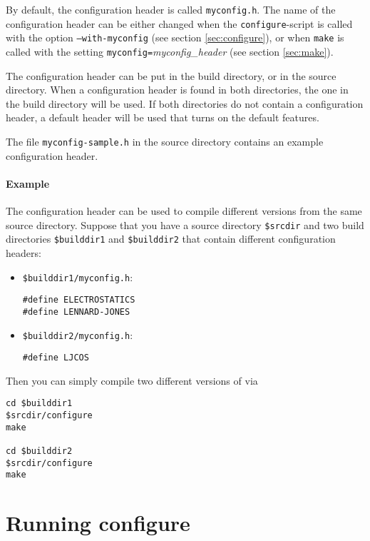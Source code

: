 By default, the configuration header is called \texttt{myconfig.h}.
The name of the configuration header can be either changed when the
\texttt{configure}-script is called with the option
\texttt{--with-myconfig} (see section \vref{sec:configure}), or when
\texttt{make} is called with the setting
\texttt{myconfig=}\textit{myconfig\_header} (see section
\vref{sec:make}).

The configuration header can be put in the build directory, or in the
source directory. When a configuration header is found in both
directories, the one in the build directory will be used. If both
directories do not contain a configuration header, a default header
will be used that turns on the default features.

The file \texttt{myconfig-sample.h} in the source directory contains
an example configuration header.

\paragraph{Example}
The configuration header can be used to compile different versions
from the same source directory. Suppose that you have a source
directory \texttt{\$srcdir} and two build directories
\texttt{\$builddir1} and \texttt{\$builddir2} that contain different
configuration headers:

\begin{itemize}
\item \texttt{\$builddir1/myconfig.h}:
\begin{verbatim}
#define ELECTROSTATICS
#define LENNARD-JONES
\end{verbatim}

\item \texttt{\$builddir2/myconfig.h}:
\begin{verbatim}
#define LJCOS
\end{verbatim}
\end{itemize}

\noindent Then you can simply compile two different versions of \es{} via
\begin{verbatim}
cd $builddir1
$srcdir/configure
make

cd $builddir2
$srcdir/configure
make
\end{verbatim}


\section{Running configure}
\label{sec:configure}

